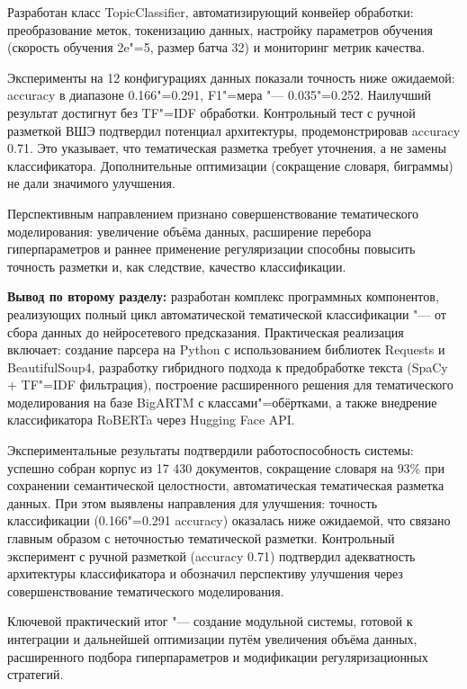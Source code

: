 \documentclass[autoref]{SCWorks}
\begin{document}
Разработан класс TopicClassifier, автоматизирующий конвейер обработки:
преобразование меток, токенизацию данных, настройку параметров обучения
(скорость обучения 2e"=5, размер батча 32) и мониторинг метрик качества.

Эксперименты на 12 конфигурациях данных показали точность ниже ожидаемой:
accuracy в диапазоне 0.166"=0.291, F1"=мера "--- 0.035"=0.252. Наилучший
результат достигнут без TF"=IDF обработки. Контрольный тест с ручной разметкой
ВШЭ подтвердил потенциал архитектуры, продемонстрировав accuracy 0.71. Это
указывает, что тематическая разметка требует уточнения, а не замены
классификатора. Дополнительные оптимизации (сокращение словаря, биграммы) не
дали значимого улучшения.

Перспективным направлением признано совершенствование тематического
моделирования: увеличение объёма данных, расширение перебора гиперпараметров и
раннее применение регуляризации способны повысить точность разметки и, как
следствие, качество классификации.

\textbf{Вывод по второму разделу:} разработан комплекс программных компонентов,
реализующих полный цикл автоматической тематической классификации "--- от сбора
данных до нейросетевого предсказания. Практическая реализация включает: создание
парсера на Python с использованием библиотек Requests и BeautifulSoup4,
разработку гибридного подхода к предобработке текста (SpaCy + TF"=IDF
фильтрация), построение расширенного решения для тематического моделирования на
базе BigARTM с классами"=обёртками, а также внедрение классификатора RoBERTa
через Hugging Face API.

Экспериментальные результаты подтвердили работоспособность системы: успешно
собран корпус из 17 430 документов, сокращение словаря на 93\% при сохранении
семантической целостности, автоматическая тематическая разметка данных. При этом
выявлены направления для улучшения: точность классификации (0.166"=0.291
accuracy) оказалась ниже ожидаемой, что связано главным образом с неточностью
тематической разметки. Контрольный эксперимент с ручной разметкой (accuracy
0.71) подтвердил адекватность архитектуры классификатора и обозначил перспективу
улучшения через совершенствование тематического моделирования.

Ключевой практический итог "--- создание модульной системы, готовой к интеграции
и дальнейшей оптимизации путём увеличения объёма данных, расширенного подбора
гиперпараметров и модификации регуляризационных стратегий.
\end{document}
